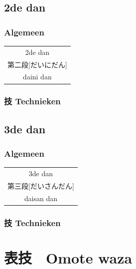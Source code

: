 \documentclass[a4paper, 12pt]{article}
\begin{document}
\begin{CJK}{UTF8}{min}
\newpage
\subsection{2de dan}
\subsubsection{Algemeen}
\begin{table}[H]
\begin{center}
\begin{tabular}{c}
2de dan\\
第二段[だいにだん]\\
daini dan
\end{tabular}
\end{center}
\label{dan_2_gen}
\end{table}

\subsubsection{技 Technieken}

\newpage
\subsection{3de dan}
\subsubsection{Algemeen}
\begin{table}[H]
\begin{center}
\begin{tabular}{c}
3de dan\\
第三段[だいさんだん]\\
daisan dan
\end{tabular}
\end{center}
\label{dan_2_gen}
\end{table}

\subsubsection{技 Technieken}

\section{表技　Omote waza}


\end{CJK}
\end{document}

